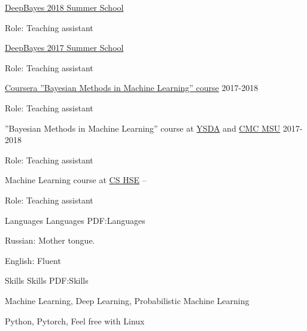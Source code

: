 \documentclass[letterpaper,MMMyyyy,nonstopmode]{simpleresumecv}
\begin{document}
\begin{Body}
\BulletItem
\href{http://deepbayes.ru/2018/}{DeepBayes 2018 Summer School}
\hfill
{}
\begin{Detail}
\Item
Role: Teaching assistant
\end{Detail}

\BulletItem
\href{http://deepbayes.ru/2017/}{DeepBayes 2017 Summer School}
\hfill
{}
\begin{Detail}
\Item
Role: Teaching assistant
\end{Detail}

\Gap

\BulletItem
\href{https://www.coursera.org/learn/bayesian-methods-in-machine-learning}
{Coursera ”Bayesian Methods in Machine Learning” course}
\hfill
2017-2018
\begin{Detail}
\Item
Role: Teaching assistant
\end{Detail}

\Gap

\BulletItem
”Bayesian Methods in Machine Learning” course at \href{https://yandexdataschool.com}{YSDA}
and \href{https://cs.msu.ru/en}{CMC MSU}
\hfill
2017-2018
\begin{Detail}
\Item
Role: Teaching assistant
\end{Detail}

\Gap

\BulletItem
Machine Learning course at \href{https://cs.hse.ru/en/}{CS HSE}
\hfill
{} --
\begin{Detail}
\Item
Role: Teaching assistant
\end{Detail}



\Section
{Languages}
{Languages}
{PDF:Languages}

\BulletItem
Russian: Mother tongue.

\Gap
\BulletItem
English: Fluent


\Section
{Skills}
{Skills}
{PDF:Skills}

\BulletItem
Machine Learning, Deep Learning, Probabilistic Machine Learning

\BulletItem
Python, Pytorch, Feel free with Linux

\iffalse

\begingroup
\color{red}


\end{Body}
\end{document}

